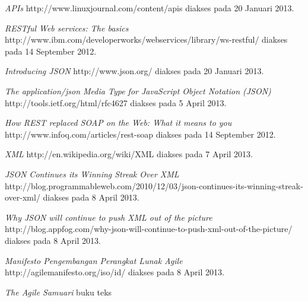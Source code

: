 \documentclass[a4paper, 12pt]{report}
\begin{document}
\begin{thebibliography}{99}
  \emph{APIs}
  http://www.linuxjournal.com/content/apis
  diakses pada 20 Januari 2013.

  \emph{RESTful Web services: The basics}
  \\http://www.ibm.com/developerworks/webservices/library/ws-restful/
  diakses pada 14 September 2012.

  \emph{Introducing JSON} http://www.json.org/
  diakses pada 20 Januari 2013.
  
  \emph{The application/json Media Type for JavaScript Object Notation (JSON)} http://tools.ietf.org/html/rfc4627
  diakses pada 5 April 2013.
    
  \emph{How REST replaced SOAP on the Web: What it means to you}
  http://www.infoq.com/articles/rest-soap
  diakses pada 14 September 2012.
  
  \emph{XML}
  http://en.wikipedia.org/wiki/XML
  diakses pada 7 April 2013.
  
  \emph{JSON Continues its Winning Streak Over XML}
  http://blog.programmableweb.com/2010/12/03/json-continues-its-winning-streak-over-xml/
  diakses pada 8 April 2013.
  
  \emph{Why JSON will continue to push XML out of the picture}
  http://blog.appfog.com/why-json-will-continue-to-push-xml-out-of-the-picture/
  diakses pada 8 April 2013.

  \emph{Manifesto Pengembangan Perangkat Lunak Agile}
  http://agilemanifesto.org/iso/id/
  diakses pada 8 April 2013.
  
  \emph{The Agile Samuari}
  buku teks
 
\end{thebibliography}
\end{document}

